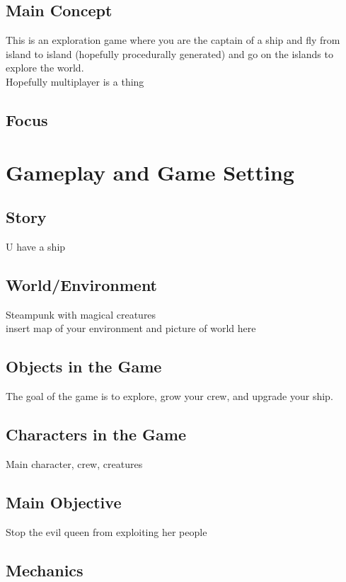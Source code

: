 \documentclass[a4paper]{scrreprt}
\begin{document}
\section{Main Concept}
This is an exploration game where you are the captain of a ship and fly from island to island (hopefully procedurally generated) and go on the islands to explore the world.
\\
Hopefully multiplayer is a thing

\section{Focus}




\chapter{Gameplay and Game Setting}


\section{Story}
U have a ship

\section{World/Environment}
Steampunk with magical creatures\\
insert map of your environment and picture of world here

\section{Objects in the Game}
The goal of the game is to explore, grow your crew, and upgrade your ship.

\section{Characters in the Game}
Main character, crew, creatures

\section{Main Objective}
Stop the evil queen from exploiting her people

\section{Mechanics}
\end{document}

